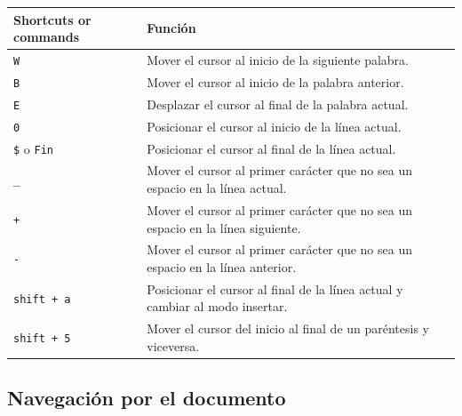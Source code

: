 \documentclass[
  doc,
  floatsintext,
  longtable,
  a4paper,
  nolmodern,
  notxfonts,
  notimes,
  12pt,
  colorlinks=true,linkcolor=blue,citecolor=blue,urlcolor=blue]{apa7}
\newcounter{none} %
\begin{document}
{\def\LTcaptype{none} %
\begin{longtable}[]{@{}
  >{\raggedright\arraybackslash}p{}
  >{\raggedright\arraybackslash}p{}@{}}
\toprule\noalign{}
\begin{minipage}[b]{\linewidth}\raggedright
Shortcuts or commands
\end{minipage} & \begin{minipage}[b]{\linewidth}\raggedright
Función
\end{minipage} \\
\midrule\noalign{}
\endhead
\bottomrule\noalign{}
\endlastfoot
\texttt{W} & Mover el cursor al inicio de la siguiente palabra. \\
\texttt{B} & Mover el cursor al inicio de la palabra anterior. \\
\texttt{E} & Desplazar el cursor al final de la palabra actual. \\
\texttt{0} & Posicionar el cursor al inicio de la línea actual. \\
\texttt{\$} o \texttt{Fin} & Posicionar el cursor al final de la línea
actual. \\
\texttt{\_} & Mover el cursor al primer carácter que no sea un espacio
en la línea actual. \\
\texttt{+} & Mover el cursor al primer carácter que no sea un espacio en
la línea siguiente. \\
\texttt{-} & Mover el cursor al primer carácter que no sea un espacio en
la línea anterior. \\
\texttt{shift\ +\ a} & Posicionar el cursor al final de la línea actual
y cambiar al modo insertar. \\
\texttt{shift\ +\ 5} & Mover el cursor del inicio al final de un
paréntesis y viceversa. \\
\end{longtable}
}

\subsection{Navegación por el
documento}\label{navegaciuxf3n-por-el-documento}
\end{document}
